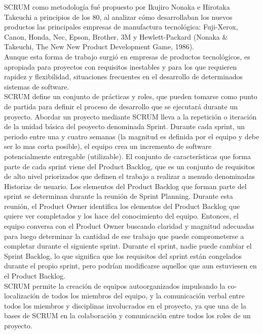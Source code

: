 \documentclass[../pfc.tex]{subfiles}
\begin{document}
	SCRUM como metodología fué propuesto por Ikujiro Nonaka e Hirotaka Takeuchi a principios de los 80, al analizar cómo desarrollaban los nuevos productos las principales empresas de manufactura tecnológica: Fuji-Xerox, Canon, Honda, Nec, Epson, Brother, 3M y Hewlett-Packard (Nonaka \& Takeuchi, The New New Product Development Game, 1986).\\
	Aunque esta forma de trabajo surgió en empresas de productos tecnológicos, es apropiada para proyectos con requisitos inestables y para los que requieren rapidez y flexibilidad, situaciones frecuentes en el desarrollo de determinados sistemas de software.\\
	
	SCRUM define un conjunto de prácticas y roles, que pueden tomarse como punto de partida para definir el proceso de desarrollo que se ejecutará durante un proyecto. Abordar un proyecto mediante SCRUM lleva a la repetición o iteración de la unidad básica del peoyecto denominada Sprint. Durante cada sprint, un periodo entre una y cuatro semanas (la magnitud es definida por el equipo y debe ser lo mas corta posible), el equipo crea un incremento de software potencialmente entregable (utilizable). El conjunto de características que forma parte de cada sprint viene del Product Backlog, que es un conjunto de requisitos de alto nivel priorizados que definen el trabajo a realizar a menudo denominadas Historias de usuario. Los elementos del Product Backlog que forman parte del sprint se determinan durante la reunión de Sprint Planning. Durante esta reunión, el Product Owner identifica los elementos del Product Backlog que quiere ver completados y los hace del conocimiento del equipo. Entonces, el equipo conversa con el Product Owner buscando claridad y magnitud adecuadas para luego determinar la cantidad de ese trabajo que puede comprometerse a completar durante el siguiente sprint. Durante el sprint, nadie puede cambiar el Sprint Backlog, lo que significa que los requisitos del sprint están congelados durante el propio sprint, pero podrían modificarse aquellos que aun estuviesen en el Product Backlog.\\
	
	SCRUM permite la creación de equipos autoorganizados impulsando la co-localización de todos los miembros del equipo, y la comunicación verbal entre todos los miembros y disciplinas involucrados en el proyecto, ya que una de la bases de SCRUM en la colaboración y comunicación entre todos los roles de un proyecto. \\
	
\end{document}
